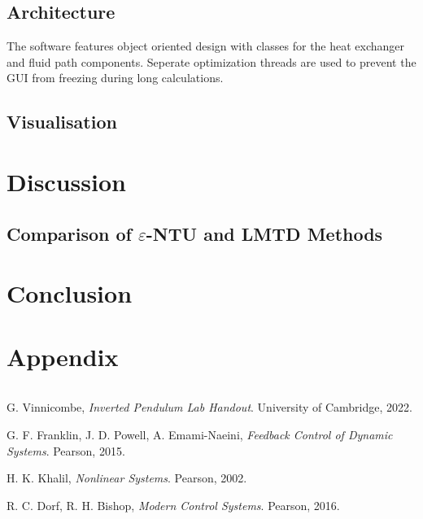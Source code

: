 \documentclass{article}
\begin{document}
\subsection{Architecture}
The software features object oriented design with classes for the heat exchanger and fluid path components.
Seperate optimization threads are used to prevent the GUI from freezing during long calculations.

\subsection{Visualisation}

\section{Discussion}

\subsection{Comparison of $\varepsilon$-NTU and LMTD Methods}



\section{Conclusion}


\newpage
\section{Appendix}

\begin {lstlisting}[language=Python]

\end{lstlisting}


\newpage
\begin{thebibliography}{9}

  G. Vinnicombe,
  \emph{Inverted Pendulum Lab Handout}.
  University of Cambridge,
  2022.

  G. F. Franklin, J. D. Powell, A. Emami-Naeini,
  \emph{Feedback Control of Dynamic Systems}.
  Pearson,
  2015.

  H. K. Khalil,
  \emph{Nonlinear Systems}.
  Pearson,
  2002.

  R. C. Dorf, R. H. Bishop,
  \emph{Modern Control Systems}.
  Pearson,
  2016.

\end{thebibliography}
\end{document}
